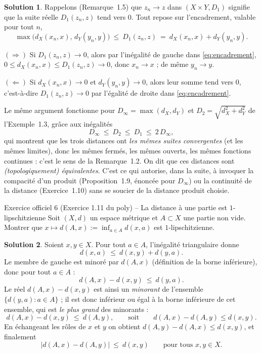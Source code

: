 \documentclass[11pt,a4paper]{article}
\newcommand{\abs}[1]{\left|#1\right|}
\newcommand{\ie}{c'est-à-dire}
\theoremstyle{definition}
\newtheorem*{solution}{Solution}
\begin{document}
\begin{solution}
Rappelons (Remarque~1.5) que $z_n\to z$ dans $(X\times Y,D_1)$ signifie que la suite réelle $D_1(z_n,z)$ tend vers $0$. Tout repose sur l'encadrement, valable pour tout $n$,
\begin{equation}\label{eq:encadrement}
\max\big(d_X(x_n,x),\,d_Y(y_n,y)\big)\ \le\ D_1(z_n,z)\ =\ d_X(x_n,x)+d_Y(y_n,y).
\end{equation}

\noindent$(\Rightarrow)$ Si $D_1(z_n,z)\to0$, alors par l'inégalité de gauche dans \eqref{eq:encadrement}, $0\le d_X(x_n,x)\le D_1(z_n,z)\to0$, donc $x_n\to x$ ; de même $y_n\to y$.

\noindent$(\Leftarrow)$ Si $d_X(x_n,x)\to0$ et $d_Y(y_n,y)\to0$, alors leur somme tend vers $0$, \ie{} $D_1(z_n,z)\to0$ par l'égalité de droite dans \eqref{eq:encadrement}.
\end{solution}

\begin{commentaire}
Le même argument fonctionne pour $D_\infty=\max(d_X,d_Y)$ et $D_2=\sqrt{d_X^2+d_Y^2}$ de l'Exemple~1.3, grâce aux inégalités
\[
D_\infty\ \le\ D_2\ \le\ D_1\ \le\ 2\,D_\infty ,
\]
qui montrent que les trois distances ont \emph{les mêmes suites convergentes} (et les mêmes limites), donc les mêmes fermés, les mêmes ouverts, les mêmes fonctions continues : c'est le sens de la Remarque~1.2. On dit que ces distances sont \emph{(topologiquement) équivalentes}. C'est ce qui autorise, dans la suite, à invoquer la compacité d'un produit (Proposition~1.9, énoncée pour $D_\infty$) ou la continuité de la distance (Exercice~1.10) sans se soucier de la distance produit choisie.
\end{commentaire}

\begin{exo}{Exercice officiel 6 (Exercice 1.11 du poly) -- La distance à une partie est $1$-lipschitzienne}
Soit $(X,d)$ un espace métrique et $A\subset X$ une partie non vide. Montrer que $x\mapsto d(A,x):=\inf_{a\in A}d(x,a)$ est $1$-lipschitzienne.
\end{exo}

\begin{solution}
Soient $x,y\in X$. Pour tout $a\in A$, l'inégalité triangulaire donne
\[
d(x,a)\ \le\ d(x,y)+d(y,a).
\]
Le membre de gauche est minoré par $d(A,x)$ (définition de la borne inférieure), donc pour tout $a\in A$ :
\[
d(A,x)-d(x,y)\ \le\ d(y,a).
\]
Le réel $d(A,x)-d(x,y)$ est ainsi un \emph{minorant} de l'ensemble $\{d(y,a):a\in A\}$ ; il est donc inférieur ou égal à la borne inférieure de cet ensemble, qui est \emph{le plus grand} des minorants :
\[
d(A,x)-d(x,y)\ \le\ d(A,y),\qquad\text{soit}\qquad d(A,x)-d(A,y)\le d(x,y).
\]
En échangeant les rôles de $x$ et $y$ on obtient $d(A,y)-d(A,x)\le d(x,y)$, et finalement
\[
\abs{d(A,x)-d(A,y)}\ \le\ d(x,y)\qquad\text{pour tous } x,y\in X .
\]
\end{solution}
\end{document}
